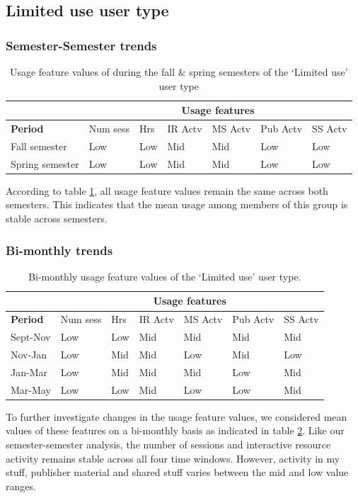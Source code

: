 \documentclass{acm_proc_article-sp}
\begin{document}
\subsection{Limited use user type}
\subsubsection{Semester-Semester trends}
\begin{table}
\caption{Usage feature values of during the fall \& spring semesters of the `Limited use' user type}
\label{cluster0semester}
\begin{tabular}{|p{1.4cm}|p{0.6cm}|p{0.6cm}|p{0.6cm}|p{0.6cm}|p{0.8cm}|p{0.8cm}|}
\hline
& \multicolumn{6}{c|}{\textbf{Usage features}}  \\ \hline
 \textbf{Period} & Num sess & Hrs & IR Actv & MS Actv & Pub Actv & SS Actv \\ \hline
 Fall  semester & Low & Low  & Mid & Mid & Low & Low \\ \hline
Spring semester & Low & Low  & Mid & Mid & Low & Low \\ \hline
\end{tabular}
\end{table}
According to table \ref{cluster0semester}, all usage feature values remain the same across both semesters. This indicates that the mean usage among members of this group is stable across semesters.
\subsubsection{Bi-monthly trends}
\begin{table}
\caption{Bi-monthly usage feature values of the `Limited use' user type.}
\label{cluster0bimonthly}
\begin{tabular}{|p{1.5cm}|p{0.6cm}|p{0.6cm}|p{0.6cm}|p{0.6cm}|p{0.8cm}|p{0.8cm}|}
\hline
& \multicolumn{6}{c|}{\textbf{Usage features}}  \\ \hline
 \textbf{Period} 
 & Num sess & Hrs & IR Actv & MS Actv & Pub Actv & SS Actv \\ \hline
Sept-Nov & Low & Low  & Mid & Mid & Mid & Mid \\ \hline
Nov-Jan & Low & Mid  & Mid & Low & Mid & Low \\ \hline
Jan-Mar & Low & Mid  & Mid & Mid & Low & Mid \\ \hline
Mar-May & Low & Low  & Mid & Low & Low & Mid \\ \hline
\end{tabular}
\end{table}
To further investigate changes in the usage feature values, we considered mean values of these features on a bi-monthly basis as indicated in table \ref{cluster0bimonthly}. Like our semester-semester analysis, the number of sessions and interactive resource activity remains stable across all four time windows.  However, activity in my stuff, publisher material and shared stuff  varies between the mid and low value ranges. 
\end{document}
